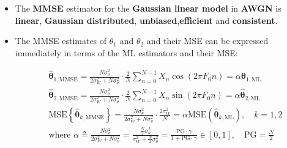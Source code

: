 \begin{itemize}
\begin{align*}
&\mathbf{\hat{\theta}}_{1,\text{MMSE}} = \frac{2\sigma_{\theta}^{2}}{2\sigma_{W}^{2} + N\sigma_{\theta}^{2}}\mathbf{h}_{1}^{T}\mathbf{X} = \frac{N\sigma_{\theta}^{2}}{2\sigma_{W}^{2} + N\sigma_{\theta}^{2}} \cdot \frac{2}{N}\sum_{n=0}^{N-1} X_{n}\cos(2\pi F_{0}n) \\
&\mathbf{\hat{\theta}}_{2,\text{MMSE}} = \frac{2\sigma_{\theta}^{2}}{2\sigma_{W}^{2} + N\sigma_{\theta}^{2}}\mathbf{h}_{2}^{T}\mathbf{X} = \frac{N\sigma_{\theta}^{2}}{2\sigma_{W}^{2} + N\sigma_{\theta}^{2}} \cdot \frac{2}{N}\sum_{n=0}^{N-1} X_{n}\sin(2\pi F_{0}n) \\
&\text{MSE}\left\{\mathbf{\hat{\theta}}_{k,\text{MMSE}}\right\} = \frac{2\sigma_{W}^{2}\sigma_{\theta}^{2}}{2\sigma_{W}^{2} + N\sigma_{\theta}^{2}} = \frac{N\sigma_{\theta}^{2}}{2\sigma_{W}^{2} + N\sigma_{\theta}^{2}} \cdot \frac{2\sigma_{W}^{2}}{N}, \quad k=1,2
\end{align*}

\item The \textbf{MMSE} estimator for the \textbf{Gaussian linear model} in \textbf{AWGN} is \textbf{linear}, \textbf{Gaussian distributed}, \textbf{unbiased},\textbf{efficient} and \textbf{consistent}.

\item The MMSE estimates of \(\theta_1\) and \(\theta_2\) and their MSE can be expressed immediately in terms of the ML estimators and their MSE:

\begin{align*}
&\mathbf{\hat{\theta}}_{1,\text{MMSE}} = \frac{N\sigma_{\theta}^{2}}{2\sigma_{W}^{2} + N\sigma_{\theta}^{2}} \cdot \frac{2}{N}\sum_{n=0}^{N-1} X_{n}\cos(2\pi F_{0}n) = \alpha\mathbf{\hat{\theta}}_{1,\text{ML}} \\
&\mathbf{\hat{\theta}}_{2,\text{MMSE}} = \frac{N\sigma_{\theta}^{2}}{2\sigma_{W}^{2} + N\sigma_{\theta}^{2}} \cdot \frac{2}{N}\sum_{n=0}^{N-1} X_{n}\sin(2\pi F_{0}n) = \alpha\mathbf{\hat{\theta}}_{2,\text{ML}} \\
&\text{MSE}\left\{\mathbf{\hat{\theta}}_{k,\text{MMSE}}\right\} = \frac{N\sigma_{\theta}^{2}}{2\sigma_{W}^{2} + N\sigma_{\theta}^{2}} \cdot \frac{2\sigma_{W}^{2}}{N} = \alpha\text{MSE}\left(\mathbf{\hat{\theta}}_{k,\text{ML}}\right), \quad k=1,2 \\
&\text{where } \alpha \triangleq \frac{N\sigma_{\theta}^{2}}{2\sigma_{W}^{2} + N\sigma_{\theta}^{2}} = \frac{\frac{N}{2}\sigma_{\theta}^{2}}{\sigma_{W}^{2} + \frac{N}{2}\sigma_{\theta}^{2}} = \frac{\text{PG} \cdot \gamma}{1 + \text{PG} \cdot \gamma} \in [0,1], \quad \text{PG} = \frac{N}{2}
\end{align*}


\end{itemize}
